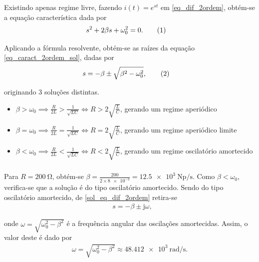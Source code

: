 \documentclass[a4paper, titlepage, portuguese]{article}
\newcommand{\eq}{\Leftrightarrow} %
\newcommand\numberthis{\addtocounter{equation}{1}\tag{\theequation}}
\newcommand\jj{\mathrm{j} }
\begin{document}
	\subsubsection{}

		\par
		Existindo apenas regime livre, fazendo $i(t) = e^{st}$ em \ref{eq_dif_2ordem}, obtém-se a equação característica dada por
		\begin{align*}
			&s^{2} + 2\beta s + \omega_{0}^{2} = 0 .\numberthis \label{eq_caract_2ordem_sol}
		\end{align*}

		Aplicando a fórmula resolvente, obtém-se as raízes da equação \ref{eq_caract_2ordem_sol}, dadas por
		\begin{align*}
			&s =   -\beta \pm \sqrt{ \beta^{2} - \omega_{0}^{2}}, \numberthis \label{sol_eq_caract_2ordem}
		\end{align*}

		originando 3 soluções distintas.

		\begin{itemize}
			\item $\beta > \omega_{0} \implies \frac{R}{2L} > \frac{1}{\sqrt{LC}} \eq R > 2
			\sqrt{\frac{L}{C}}$, gerando um regime aperiódico

			\item $\beta = \omega_{0} \implies \frac{R}{2L} = \frac{1}{\sqrt{LC}} \eq R = 2
			\sqrt{\frac{L}{C}}$, gerando um regime aperiódico limite

			\item $\beta < \omega_{0} \implies \frac{R}{2L} < \frac{1}{\sqrt{LC}} \eq R < 2
			\sqrt{\frac{L}{C}}$, gerando um regime oscilatório amortecido
		\end{itemize}

	\subsubsection{}

		\par
		Para $R = \SI{200}{\ohm} $, obtém-se $\beta = \frac{200}{2 \times \num{8e-3}} = \SI{12.5e3}{\neper\per\second}$. Como $\beta < \omega_{0}$, verifica-se que a solução é do tipo oscilatório amortecido. Sendo do tipo oscilatório amortecido, de \ref{sol_eq_dif_2ordem} retira-se
		\begin{align*}
			&s =   -\beta \pm \jj \omega,
		\end{align*}

		onde $\omega = \sqrt{\omega_{0}^{2} - \beta^{2}}$ é a frequência angular das oscilações amortecidas. Assim, o valor deste é dado por
		\begin{align*}
			\omega = \sqrt{\omega_{0}^{2} - \beta^{2}} \approx \SI{48.412e3}{\radian\per\second}.
		\end{align*}
\end{document}

